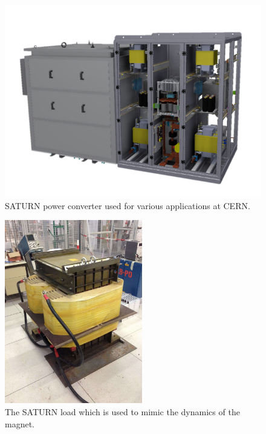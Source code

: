 \documentclass[a4paper, 10pt, conference]{ieeeconf}
\begin{document}
\begin{figure}
\centering
\includegraphics[width=\columnwidth]{../pics/Saturn_1}
\caption{SATURN power converter used for various applications at CERN.}
\label{fig:saturn_pc}
\end{figure} 

\begin{figure}
\centering
\includegraphics[width=\columnwidth, height=8cm]{../pics/load}
\caption{The SATURN load which is used to mimic the dynamics of the magnet.}
\label{fig:load}
\end{figure} 
\end{document}
